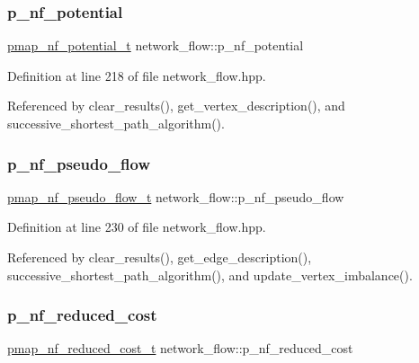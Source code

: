 \subsubsection{\texorpdfstring{p\+\_\+nf\+\_\+potential}{p\_nf\_potential}}
{\footnotesize\ttfamily \hyperlink{classnetwork__flow_a27c9b52e67a89ed0f6584017fdf365a5}{pmap\+\_\+nf\+\_\+potential\+\_\+t} network\+\_\+flow\+::p\+\_\+nf\+\_\+potential}



Definition at line 218 of file network\+\_\+flow.\+hpp.



Referenced by clear\+\_\+results(), get\+\_\+vertex\+\_\+description(), and successive\+\_\+shortest\+\_\+path\+\_\+algorithm().

\mbox{\label{classnetwork__flow_a163ed5310281866485a8d0f2c1790822}} 
\subsubsection{\texorpdfstring{p\+\_\+nf\+\_\+pseudo\+\_\+flow}{p\_nf\_pseudo\_flow}}
{\footnotesize\ttfamily \hyperlink{classnetwork__flow_ae2897f4e40c2208d05a1939f4c2f626f}{pmap\+\_\+nf\+\_\+pseudo\+\_\+flow\+\_\+t} network\+\_\+flow\+::p\+\_\+nf\+\_\+pseudo\+\_\+flow}



Definition at line 230 of file network\+\_\+flow.\+hpp.



Referenced by clear\+\_\+results(), get\+\_\+edge\+\_\+description(), successive\+\_\+shortest\+\_\+path\+\_\+algorithm(), and update\+\_\+vertex\+\_\+imbalance().

\mbox{\label{classnetwork__flow_a5b34d0732f83191a038bd7031d7aa765}} 
\subsubsection{\texorpdfstring{p\+\_\+nf\+\_\+reduced\+\_\+cost}{p\_nf\_reduced\_cost}}
{\footnotesize\ttfamily \hyperlink{classnetwork__flow_a54ee3bb5e8f6488106a18c778c2ab92e}{pmap\+\_\+nf\+\_\+reduced\+\_\+cost\+\_\+t} network\+\_\+flow\+::p\+\_\+nf\+\_\+reduced\+\_\+cost}




